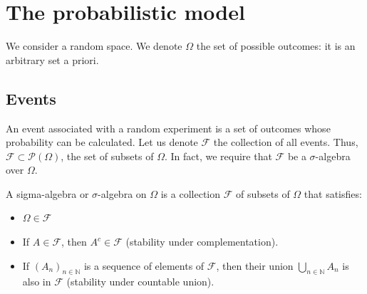 \chapter{ The probabilistic model}%
\sloppy
We consider a random space. We denote $\Omega$ the set of possible outcomes: it is an arbitrary set a priori.%
\section{Events}%
An event associated with a random experiment is a set of outcomes whose probability can be calculated. Let us denote $\mathcal{F}$ the collection of all events.
Thus, $\mathcal{F} \subset \mathcal{P}(\Omega)$, the set of subsets of $\Omega$. In fact, we require that $\mathcal{F}$ be a $\sigma$-algebra over $\Omega$.%
\begin{definition}
A sigma-algebra or $\sigma$-algebra on $\Omega$ is a collection $\mathcal{F}$ of subsets of $\Omega$ that satisfies:
\begin{itemize}
    \item $\Omega \in \mathcal{F}$
    \item If $A \in \mathcal{F}$, then $A^c \in \mathcal{F}$ (stability under complementation).
    \item If $(A_n)_{n \in \mathbb{N}}$ is a sequence of elements of $\mathcal{F}$, then their union $\bigcup_{n \in \mathbb{N}} A_n$ is also in $\mathcal{F}$ (stability under countable union).
\end{itemize}
\end{definition}%


